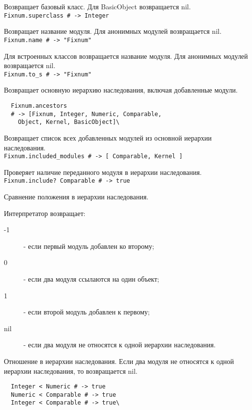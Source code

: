 \begin{methodlist}
  Возвращает базовый класс. Для BasicObject возвращается nil. 
  \\\verb!Fixnum.superclass # -> Integer!

  Возвращает название модуля. Для анонимных модулей возвращается nil. 
  \\\verb!Fixnum.name # -> "Fixnum"!
 
  Для встроенных классов возвращается название модуля. Для анонимных модулей возвращается nil. 
  \\\verb!Fixnum.to_s # -> "Fixnum"!
 
  Возвращает основную иерархию наследования, включая добавленные модули.
  \begin{verbatim}
  Fixnum.ancestors 
  # -> [Fixnum, Integer, Numeric, Comparable,
    Object, Kernel, BasicObject]\
  \end{verbatim}
 
  Возвращает список всех добавленных модулей из основной иерархии наследования.
  \\\verb!Fixnum.included_modules # -> [ Comparable, Kernel ]!  

  Проверяет наличие переданного модуля в иерархии наследования. 
  \\\verb!Fixnum.include? Comparable # -> true!
 
  Сравнение положения в иерархии наследования.
  
  Интерпретатор возвращает:
  \begin{description}
    \item[-1] - если первый модуль добавлен ко второму; 
    \item[0] - если два модуля ссылаются на один объект; 
    \item[1] - если второй модуль добавлен к первому; 
    \item[nil] - если два модуля не относятся к одной иерархии наследования.
  \end{description} 

  Отношение в иерархии наследования. Если два модуля не относятся к одной иерархии наследования, то возвращается nil.
  \begin{verbatim}
  Integer < Numeric # -> true
  Numeric < Comparable # -> true
  Integer < Comparable # -> true\
  \end{verbatim}


\end{methodlist}
